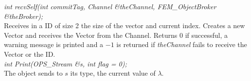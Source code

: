 {\em int recvSelf(int commitTag, Channel \&theChannel, 
FEM\_ObjectBroker \&theBroker); } \\ 
Receives in a ID of size 2 the size of the vector and current index.
Creates a new Vector and receives the Vector from the Channel. 
Returns $0$ if successful, a warning message is printed and a $-1$ is
returned if {\em theChannel} fails to receive the Vector or the ID.\\

{\em int Print(OPS_Stream \&s, int flag = 0);}\\
The object sends to $s$ its type, the current value of $\lambda$.
